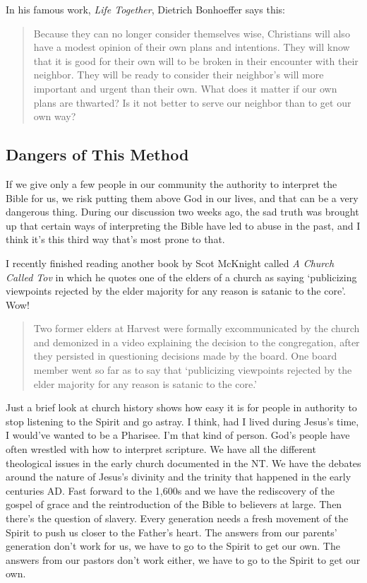 In his famous work, \textit{Life Together}, Dietrich Bonhoeffer says this:

\begin{quote}
    Because they can no longer consider themselves wise, Christians will also
    have a modest opinion of their own plans and intentions. They will know that
    it is good for their own will to be broken in their encounter with their
    neighbor.  They will be ready to consider their neighbor's will more
    important and urgent than their own. What does it matter if our own plans
    are thwarted? Is it not better to serve our neighbor than to get our own
    way?
\end{quote}

\subsection{Dangers of This Method}

If we give only a few people in our community the authority to interpret the
Bible for us, we risk putting them above God in our lives, and that can be a
very dangerous thing. During our discussion two weeks ago, the sad truth was
brought up that certain ways of interpreting the Bible have led to abuse in the
past, and I think it's this third way that's most prone to that.

I recently finished reading another book by Scot McKnight called \textit{A
Church Called Tov} in which he quotes one of the elders of a church as saying
`publicizing viewpoints rejected by the elder majority for any reason is satanic
to the core'. Wow!

\begin{quote}
    Two former elders at Harvest were formally excommunicated by the church and
    demonized in a video explaining the decision to the congregation, after they
    persisted in questioning decisions made by the board. One board member went
    so far as to say that `publicizing viewpoints rejected by the elder majority
    for any reason is satanic to the core.'
\end{quote}

Just a brief look at church history shows how easy it is for people in authority
to stop listening to the Spirit and go astray. I think, had I lived during
Jesus's time, I would've wanted to be a Pharisee. I'm that kind of person. God's
people have often wrestled with how to interpret scripture. We have all the
different theological issues in the early church documented in the NT. We have
the debates around the nature of Jesus's divinity and the trinity that happened
in the early centuries AD. Fast forward to the 1,600s and we have the
rediscovery of the gospel of grace and the reintroduction of the Bible to
believers at large. Then there's the question of slavery. Every generation needs
a fresh movement of the Spirit to push us closer to the Father's heart. The
answers from our parents' generation don't work for us, we have to go to the
Spirit to get our own. The answers from our pastors don't work either, we have
to go to the Spirit to get our own.

